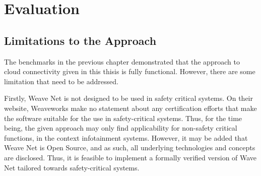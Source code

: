 
\chapter{Evaluation}\label{chapter:evaluation}


\section{Limitations to the Approach}

The benchmarks in the previous chapter demonstrated that the approach to cloud connectivity given in this thisis is fully functional. However, there are some limitation that need to be addressed.

Firstly, Weave Net is not designed to be used in safety critical systems. On their website, Weaveworks make no statement about any certification efforts that make the software suitable for the use in safety-critical systems. Thus, for the time being, the given approach may only find applicability for non-safety critical functions, \eg in the context infotainment systems. However, it may be added that Weave Net is Open Source, and as such, all underlying technologies and concepts are disclosed. Thus, it is feasible to implement a formally verified version of Wave Net tailored towards safety-critical systems.